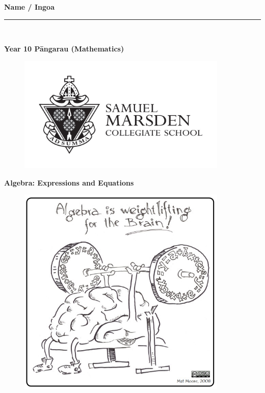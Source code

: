 \documentclass[a4paper,12pt]{article}
\begin{document}
	\thispagestyle{empty}
	\LARGE
\textbf{Name / Ingoa}  \rule[0pt]{12cm}{0.5pt}\\
\begin{center}
	\textbf{Year 10 Pāngarau (Mathematics)}
\end{center}
\begin{figure}[!h]
	\centering
	\includegraphics[width=10cm]{other_graphics/marsden_black_white.jpg}
\end{figure}
\begin{center}
	\textbf{Algebra: Expressions and Equations}
\end{center}

\begin{figure}[!h]
	\centering
	\includegraphics[width=10cm]{other_graphics/algebra_weightlifting.jpeg}
\end{figure}

\normalsize
	\newpage
	\setcounter{tocdepth}{2}
	\tableofcontents
	\newpage


\end{document}
